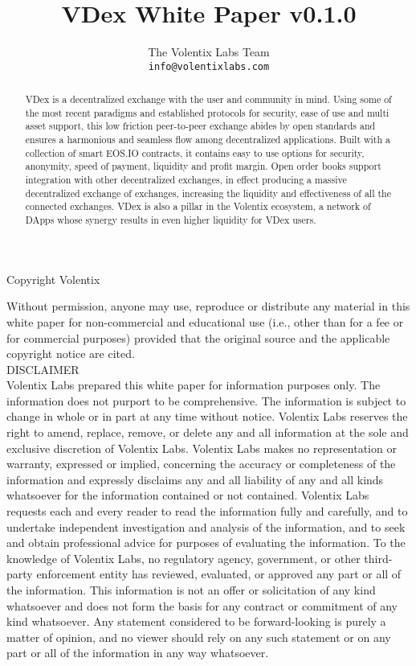 \documentclass[]{article}
\title{VDex White Paper v0.1.0}
\author{
		The Volentix Labs Team\\
	\texttt{info@volentixlabs.com}
}
\begin{document}
\tableofcontents
\maketitle
\begin{description}
\item Copyright  Volentix
\end{description}

{\tiny Without permission, anyone may use, reproduce or distribute any material in this white paper for non-commercial and educational use (i.e., other than for a fee or for commercial purposes) provided that the original source and the applicable copyright notice are cited.\\

DISCLAIMER \\

Volentix Labs prepared this white paper for information purposes only. The information does not purport to be comprehensive. The information is subject to change in whole or in part at any time without notice. Volentix Labs reserves the right to amend, replace, remove, or delete any and all information at the sole and exclusive discretion of Volentix Labs. Volentix Labs makes no representation or warranty, expressed or implied, concerning the accuracy or completeness of the information and expressly disclaims any and all liability of any and all kinds whatsoever for the information contained or not contained. Volentix Labs requests each and every reader to read the information fully and carefully, and to undertake independent investigation and analysis of the information, and to seek and obtain professional advice for purposes of evaluating the information. To the knowledge of Volentix Labs, no regulatory agency, government, or other third-party enforcement entity has reviewed, evaluated, or approved any part or all of the information. This information is not an offer or solicitation of any kind whatsoever and does not form the basis for any contract or commitment of any kind whatsoever. Any statement considered to be forward-looking is purely a matter of opinion, and no viewer should rely on any such statement or on any part or all of the information in any way whatsoever.

\begin{abstract}

VDex is a decentralized exchange with the user and community in mind. 
Using some of the most recent paradigms and established protocols for security, 
ease of use and multi asset support, this low friction peer-to-peer exchange 
abides by open standards and ensures a harmonious and seamless flow among 
decentralized applications. Built with a collection of smart EOS.IO contracts, 
it contains easy to use options for security, anonymity, speed of payment, liquidity and profit margin.
Open order books support integration with other decentralized exchanges, 
in effect producing a massive decentralized exchange of exchanges,
 increasing the liquidity and effectiveness of all the connected exchanges.
VDex is also a pillar in the Volentix ecosystem, a network of DApps whose synergy results in even
higher liquidity for VDex users.
\end{abstract}
}
\end{document}
